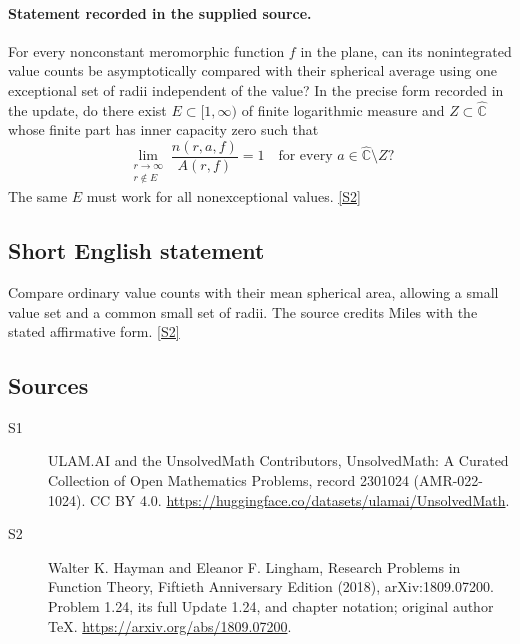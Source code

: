 \documentclass[11pt]{article}
\newcommand{\sref}[2]{\hyperlink{source:#1:#2}{[S#2]}}
\begin{document}
\paragraph{Statement recorded in the supplied source.}
For every nonconstant meromorphic function $f$ in the plane, can its nonintegrated value counts be asymptotically compared with their spherical average using one exceptional set of radii independent of the value? In the precise form recorded in the update, do there exist $E\subset[1,\infty)$ of finite logarithmic measure and $Z\subset\widehat{\mathbb C}$ whose finite part has inner capacity zero such that
\[
 \lim_{\substack{r\to\infty\\r\notin E}}\frac{n(r,a,f)}{A(r,f)}=1
 \quad\text{for every }a\in\widehat{\mathbb C}\setminus Z?
\]
The same $E$ must work for all nonexceptional values. \sref{2301024}{2}
\subsection{Short English statement}
Compare ordinary value counts with their mean spherical area, allowing a small value set and a common small set of radii. The source credits Miles with the stated affirmative form. \sref{2301024}{2}
\subsection{Sources}
\begin{description}
\item[\hypertarget{source:2301024:1}{S1}] ULAM.AI and the UnsolvedMath Contributors, UnsolvedMath: A Curated Collection of Open Mathematics Problems, record 2301024 (AMR-022-1024). CC BY 4.0. \url{https://huggingface.co/datasets/ulamai/UnsolvedMath}.
\item[\hypertarget{source:2301024:2}{S2}] Walter K. Hayman and Eleanor F. Lingham, Research Problems in Function Theory, Fiftieth Anniversary Edition (2018), arXiv:1809.07200. Problem 1.24, its full Update 1.24, and chapter notation; original author TeX. \url{https://arxiv.org/abs/1809.07200}.
\end{description}
\label{end:2301024}
\end{document}
